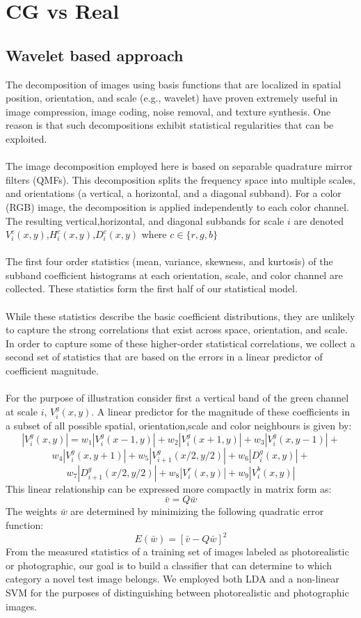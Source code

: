 \documentclass[10pt,a4paper]{book}
\begin{document}
\section{CG vs Real}
\subsection{Wavelet based approach}
The decomposition of images using basis functions that are localized in spatial position, orientation, and
scale (e.g., wavelet) have proven extremely useful in image compression, image coding, noise removal, and
texture synthesis. One reason is that such decompositions exhibit statistical regularities that can be exploited.\\\\
The image decomposition employed here is based on separable quadrature mirror filters (QMFs).
This decomposition splits the frequency space into multiple scales, and orientations (a vertical, a horizontal, and a diagonal subband). For a color (RGB) image, the decomposition is applied independently to each color channel. The resulting vertical,horizontal, and diagonal subbands for scale $i$ are denoted
$V_i^{c}(x,y)$,$H_i^{c}(x,y)$,$D_i^{c}(x,y)$ where $c \in \{r,g,b\}$\\\\
The first four order statistics (mean, variance, skewness, and kurtosis) of the subband coefficient histograms at each orientation, scale, and color channel are collected. These statistics form the first half of our statistical model.\\\\
While these statistics describe the basic coefficient distributions, they are unlikely to capture the strong correlations that exist across space, orientation, and scale.
In order to capture some of these higher-order statistical correlations, we collect a second set of statistics that are based on the errors in a linear predictor of coefficient magnitude.\\\\
For the purpose of illustration consider first a vertical band of the green channel at scale $i$, $V_i^g(x,y)$. A linear predictor for the magnitude of these coefficients in a subset of all possible spatial, orientation,scale and color neighbours is given by:\\
$$ |V_i^g(x,y)| = w_1 |V_i^g(x-1,y)| + w_2 |V_i^g(x+1,y)| + w_3 |V_i^g(x,y-1)| +$$
$$ w_4 |V_i^g(x,y+1)| + w_5 |V_{i+1}^g(x/2,y/2)| + w_6 |D_i^g(x,y)|+$$
$$ w_7|D_{i+1}^g(x/2,y/2)|+w_8|V_i^r(x,y)| + w_9|V_i^b(x,y)|$$
This linear relationship can be expressed more compactly in matrix form as: 
$$ \bar v = Q \bar w$$
The weights $\bar w$ are determined by minimizing the following quadratic error function:
$$ E(\bar w) = [\bar v - Q \bar w]^2$$
From the measured statistics of a training set of images labeled as photorealistic or photographic, our goal is to build a classifier that can determine to which category a novel test image belongs.
We employed both LDA and a non-linear SVM for the purposes of distinguishing between photorealistic and
photographic images.
\end{document}
